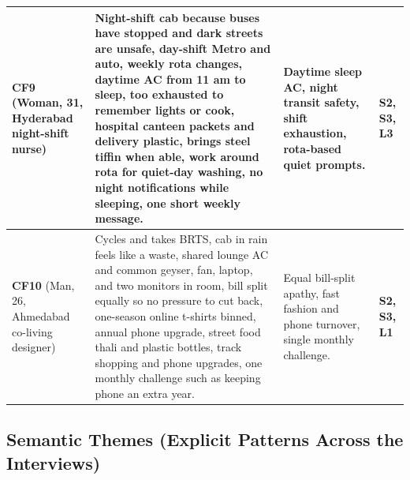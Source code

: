 \documentclass[12pt, a4paper]{article}
\begin{document}
\begin{longtable}{|>{\raggedright\arraybackslash}p{3.0cm}|>{\raggedright\arraybackslash}p{7.1cm}|>{\raggedright\arraybackslash}p{3.7cm}|>{\raggedright\arraybackslash}p{1.9cm}|}
\textbf{CF9} \cite{cf9} (Woman, 31, Hyderabad night-shift nurse) & 
Night-shift cab because buses have stopped and dark streets are unsafe, day-shift Metro and auto, weekly rota changes, daytime AC from 11 am to sleep, too exhausted to remember lights or cook, hospital canteen packets and delivery plastic, brings steel tiffin when able, work around rota for quiet-day washing, no night notifications while sleeping, one short weekly message. & 
Daytime sleep AC, night transit safety, shift exhaustion, rota-based quiet prompts. & 
\textbf{S2, S3, L3} \\
\hline

\textbf{CF10} \cite{cf10} (Man, 26, Ahmedabad co-living designer) & 
Cycles and takes BRTS, cab in rain feels like a waste, shared lounge AC and common geyser, fan, laptop, and two monitors in room, bill split equally so no pressure to cut back, one-season online t-shirts binned, annual phone upgrade, street food thali and plastic bottles, track shopping and phone upgrades, one monthly challenge such as keeping phone an extra year. & 
Equal bill-split apathy, fast fashion and phone turnover, single monthly challenge. & 
\textbf{S2, S3, L1} \\
\hline
\end{longtable}

\subsection{Semantic Themes (Explicit Patterns Across the Interviews)}
\end{document}
